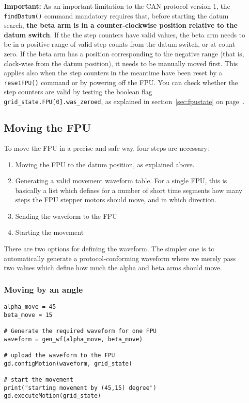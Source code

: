 \documentclass{scrartcl}[12pt,a4paper]
\begin{document}
\textbf{Important:} As an important limitation to the CAN protocol
version 1, the \texttt{findDatum()} command mandatory requires that,
before starting the datum search, \textbf{the beta arm is in a
  counter-clockwise position relative to the datum switch}. If the the
step counters have valid values, the beta arm needs to be in a
positive range of valid step counts from the datum switch, or at count
zero. If the beta arm has a position corresponding to the negative
range (that is, clock-wise from the datum position), it needs to be
manually moved first.  This applies also when the step counters in the
meantime have been reset by a \texttt{resetFPU()} command or by
powering off the FPU. You can check whether the step counters are
valid by testing the boolean flag \verb+grid_state.FPU[0].was_zeroed+,
as explained in section~\ref{sec:fpustate} on
page~\pageref{sec:fpustate}.


\subsection{Moving the FPU}

To move the FPU in a precise and safe way, four steps are necessary:

\begin{enumerate}
\item Moving the FPU to the datum position, as explained above.

\item Generating a valid movement waveform table. For a single FPU,
  this is basically a list which defines for a number of short time
  segments how many steps the FPU stepper motors should move, and in
  which direction.

\item Sending the waveform to the FPU
\item Starting the movement
  
\end{enumerate}

There are two options for defining the waveform. The simpler one is to
automatically generate a protocol-conforming waveform where we merely
pass two values which define how much the alpha and beta arms should
move.

\subsubsection{Moving by an angle}

\begin{verbatim}
alpha_move = 45
beta_move = 15

# Generate the required waveform for one FPU
waveform = gen_wf(alpha_move, beta_move)

# upload the waveform to the FPU
gd.configMotion(waveform, grid_state)

# start the movement
print("starting movement by (45,15) degree")
gd.executeMotion(grid_state)
\end{verbatim}
\end{document}
